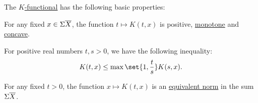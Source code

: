 \begin{proposition}\label{def:k_functional_properties}
  The \hyperref[def:k_functional]{\( K \)-functional} has the following basic properties:

  \begin{thmenum}
     For any fixed \( x \in \Sigma \oline{X} \), the function \( t \mapsto K(t, x) \) is positive, \hyperref[def:order_function]{monotone} and \hyperref[def:convex_function]{concave}.

     For positive real numbers \( t, s > 0 \), we have the following inequality:
    \begin{equation}\label{eq:def:k_functional_properties/inequality}
      K(t, x) \leq \max\set{1, \frac t s} K(s, x).
    \end{equation}

     For any fixed \( t > 0 \), the function \( x \mapsto K(t, x) \) is an \hyperref[def:equivalent_metrics]{equivalent norm} in the sum \( \Sigma \oline{X} \).
  \end{thmenum}
\end{proposition}

